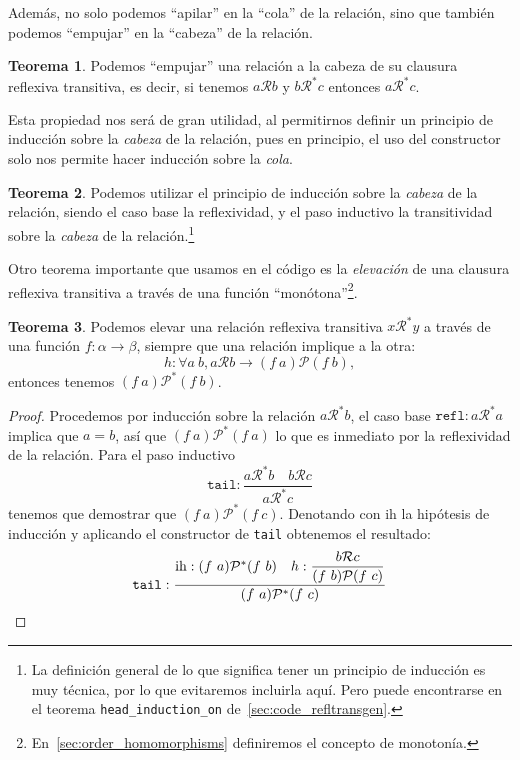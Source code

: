 \documentclass[
  a4paper, 
  10pt, 
  parskip=half, 
  toc=bibliography,
]{scrbook}
\theoremstyle{definition}
\theoremstyle{bolddef}
\newtheorem{theorem}{Teorema}[section]
\newcommand{\funfont}[1]{\texttt{#1}}
\begin{document}
Además, no solo podemos \enquote{apilar} en la \enquote{cola} de la relación, sino
que también podemos \enquote{empujar} en la \enquote{cabeza} de la relación.

\begin{theorem}
  Podemos \enquote{empujar} una relación a la cabeza de su clausura reflexiva
  transitiva, es decir, si tenemos \(a \mathcal{R} b\) y \(b \mathcal{R}^* c\) entonces
  \(a \mathcal{R}^* c\).
\end{theorem}

Esta propiedad nos será de gran utilidad, al permitirnos definir un
principio de inducción sobre la \emph{cabeza} de la relación, pues en principio, el uso del 
constructor solo nos permite hacer inducción sobre la \emph{cola}.

\begin{theorem}
  Podemos utilizar el principio de inducción sobre la \emph{cabeza} de la relación, 
  siendo el caso base la reflexividad, y el paso inductivo la transitividad sobre la
  \emph{cabeza} de la relación.\footnote{
    La definición general de lo que significa tener un principio de inducción es muy técnica, 
    por lo que evitaremos incluirla aquí. 
    Pero puede encontrarse en el teorema \texttt{head\_induction\_on} de~\ref{sec:code_refltransgen}.}
\end{theorem}

Otro teorema importante que usamos en el código es la \emph{elevación} de una
clausura reflexiva transitiva a través de una función \enquote{monótona}\footnote{
  En~\ref{sec:order_homomorphisms} definiremos el concepto de monotonía.}.

\begin{theorem}\label{thm:rel_lift}
  Podemos elevar una relación reflexiva transitiva \(x \mathcal{R}^* y\) a través de una función
  \(f: \alpha \to \beta\), siempre que una relación implique a la otra:
  \[h: \forall a \ b, a \mathcal{R} b \to (f \ a) \mathcal{P} (f \ b),\]
  entonces tenemos \((f \ a) \mathcal{P}^* (f \ b)\).
\end{theorem}

\begin{proof}
  Procedemos por inducción sobre la relación \(a \mathcal{R}^* b\), el caso base
  \(\funfont{refl}: a \mathcal{R}^* a\) implica que \(a = b\), así que
  \((f \ a) \mathcal{P}^* (f \ a)\)
  lo que es inmediato por la reflexividad de la relación. Para el paso inductivo
  \[
    \funfont{tail}: \frac{
      a \mathcal{R}^* b 
      \quad 
      b \mathcal{R} c
    }{a \mathcal{R}^* c}
  \]
  tenemos que demostrar que \((f \ a) \mathcal{P}^* (f \ c)\).
  Denotando con \(\text{ih}\) la hipótesis de inducción y aplicando el
  constructor de \texttt{tail} obtenemos el resultado:
  \[
    \funfont{tail}: \frac{
      \text{ih}: (f \ a) \mathcal{P}^* (f \ b)
      \quad
      h: \displaystyle{\frac{
        b \mathcal{R} c
      }{
        (f \ b) \mathcal{P} (f \ c)
      }}
    }{
      (f \ a) \mathcal{P}^* (f \ c)
    } \qedhere
  \]
\end{proof}
\end{document}
